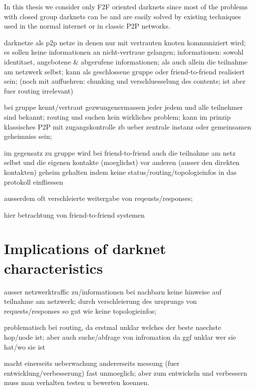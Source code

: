 In this thesis we consider only F2F oriented darknets since most of the problems with closed group darknets can be and are easily solved by existing techniques used in the normal internet or in classic P2P networks.


darknetze als p2p netze in denen nur mit vertrauten knoten kommuniziert wird; es sollen keine informationen an nicht-vertraue gelangen; informationen: sowohl identitaet, angebotene & abgerufene informationen; als auch allein die teilnahme am netzwerk selbst; kann als geschlossene gruppe oder friend-to-friend realisiert sein; (noch mit auffuehren: chunking und verschluesselung des contents; ist aber fuer routing irrelevant)

bei gruppe kennt/vertraut gezwungenermassen jeder jedem und alle teilnehmer sind bekannt; routing und suchen kein wirkliches problem; kann im prinzip klassisches P2P mit zugangskontrolle zb ueber zentrale instanz oder gemeinsamen geheimniss sein;

im gegensatz zu gruppe wird bei friend-to-friend auch die teilnahme am netz selbst und die eigenen kontakte (moeglichst) vor anderen (ausser den direkten kontakten) geheim gehalten indem keine status/routing/topologieinfos in das protokoll einfliessen

ausserdem oft verschleierte weitergabe von reqeusts/responses;

hier betrachtung von friend-to-friend systemen

\section{Implications of darknet characteristics}

ausser netzwerktraffic zu/informationen bei nachbarn keine hinweise auf teilnahme am netzwerk; durch verschleierung des ursprungs von requests/responses so gut wie keine topologieinfos;

problematisch bei routing, da erstmal unklar welches der beste naechste hop/node ist; aber auch suche/abfrage von infromation da ggf unklar wer sie hat/wo sie ist

macht einerseits ueberwachung andererseits messung (fuer entwicklung/verbesserung) fast unmoeglich; aber zum entwickeln und verbessern muss man verhalten testen u bewerten koennen.

